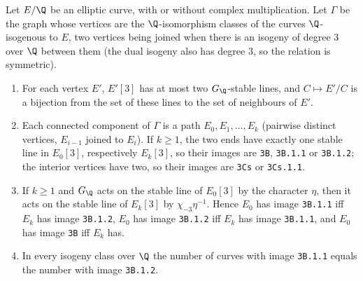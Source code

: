 \begin{proposition}\label{prop:galrep:3-isogeny-paths}
Let $E/\Q$ be an elliptic curve, with or without complex multiplication. Let $\Gamma$ be the graph whose vertices are the $\Q$-isomorphism classes of the
curves $\Q$-isogenous to $E$, two vertices being joined when there is an isogeny of degree $3$ over $\Q$ between them (the dual isogeny also has degree
$3$, so the relation is symmetric).
\begin{enumerate}[label=(\roman*)]
\item For each vertex $E'$, $E'[3]$ has at most two $G_\Q$-stable lines, and $C\mapsto E'/C$ is a bijection from the set of these lines to the set of
neighbours of $E'$.
\item Each connected component of $\Gamma$ is a path $E_0,E_1,\dots,E_k$ (pairwise distinct vertices, $E_{i-1}$ joined to $E_i$). If $k\ge1$, the two ends
have exactly one stable line in $E_0[3]$, respectively $E_k[3]$, so their images are \texttt{3B}, \texttt{3B.1.1} or \texttt{3B.1.2}; the interior vertices
have two, so their images are \texttt{3Cs} or \texttt{3Cs.1.1}.
\item If $k\ge1$ and $G_\Q$ acts on the stable line of $E_0[3]$ by the character $\eta$, then it acts on the stable line of $E_k[3]$ by $\chi_{-3}\eta^{-1}$.
Hence $E_0$ has image \texttt{3B.1.1} iff $E_k$ has image \texttt{3B.1.2}, $E_0$ has image \texttt{3B.1.2} iff $E_k$ has image \texttt{3B.1.1}, and
$E_0$ has image \texttt{3B} iff $E_k$ has.
\item In every isogeny class over $\Q$ the number of curves with image \texttt{3B.1.1} equals the number with image \texttt{3B.1.2}.
\end{enumerate}
\end{proposition}

